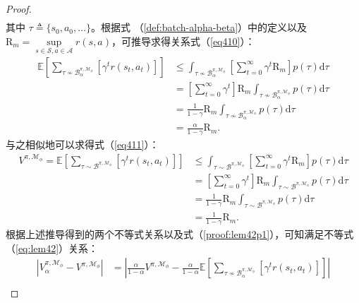 \begin{proof}
\begin{equation}
\begin{aligned}
\end{aligned}
\end{equation}
其中 $\tau\triangleq\{s_0,a_0,\ldots\}$。根据式 （\ref{def:batch-alpha-beta}）中的定义以及  $\mathrm{R}_{m}=\underset{s\in\mathcal{S},a\in\mathcal{A}}{\sup}r(s,a)$，可推导求得关系式（\ref{eq410}）：
\begin{equation}\label{eq410}
\begin{aligned}
\mathbb{E}\left[{\sum}_{\tau \not\sim\mathcal{B}_\alpha^{\pi,\mathcal{M}_\phi}}\left[\gamma^t r(s_t,a_t)\right]\right] &\leq\int_{\tau\not\sim{\mathcal{B}_\alpha^{\pi,\mathcal{M}_\phi}}}\left[\sum_{t=0}^\infty\gamma^t \mathrm{R}_m\right]p(\tau)\mathrm{d}\tau\\
&=\left[\sum_{t=0}^\infty\gamma^t\right]\mathrm{R}_m\int_{\tau\not\sim{\mathcal{B}_\alpha^{\pi,\mathcal{M}_\phi}}}p(\tau)\mathrm{d}\tau\\
&= \frac{1}{1-\gamma}\mathrm{R}_m \int_{\tau\not\sim{\mathcal{B}_\alpha^{\pi,\mathcal{M}_\phi}}}p(\tau)\mathrm{d}\tau\\
&=\frac{\alpha}{1-\gamma}\mathrm{R}_m.
\end{aligned}
\end{equation}
与之相似地可以求得式（\ref{eq411}）：
\begin{equation}\label{eq411}
\begin{aligned}
V^{\pi,\mathcal{M}_\phi} = \mathbb{E}\left[{\sum}_{\tau \sim\mathcal{B}^{\pi,\mathcal{M}_\phi}}\left[\gamma^t r(s_t,a_t)\right]\right] &\leq\int_{\tau \sim\mathcal{B}^{\pi,\mathcal{M}_\phi}}\left[\sum_{t=0}^\infty\gamma^t \mathrm{R}_m\right]p(\tau)\mathrm{d}\tau\\
&=\left[\sum_{t=0}^\infty\gamma^t\right]\mathrm{R}_m\int_{\tau \sim\mathcal{B}^{\pi,\mathcal{M}_\phi}}p(\tau)\mathrm{d}\tau\\
&= \frac{1}{1-\gamma}\mathrm{R}_m \int_{\tau \sim\mathcal{B}^{\pi,\mathcal{M}_\phi}}p(\tau)\mathrm{d}\tau\\
&=\frac{1}{1-\gamma}\mathrm{R}_m.
\end{aligned}
\end{equation}
根据上述推导得到的两个不等式关系以及式（\ref{proof:lem42p1}），可知满足不等式（\ref{eq:lem42}）关系：
\begin{equation}
\begin{aligned}
|{V}_\alpha^{\pi, \mathcal{M}_{\phi}} - {V}^{\pi,\mathcal{M}_{\phi}}| &=  \left|\frac{\alpha}{1-\alpha}V^{\pi,\mathcal{M}_\phi}-\frac{\alpha}{1-\alpha}\mathbb{E}\left[{\sum}_{\tau \not\sim\mathcal{B}_\alpha^{\pi,\mathcal{M}_\phi}}\left[\gamma^t r(s_t,a_t)\right]\right]\right| \\

\end{aligned}
\end{equation}
\end{proof}

